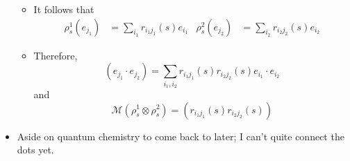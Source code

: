\documentclass[../notes.tex]{subfiles}
\begin{document}
\begin{itemize}
\begin{itemize}
        \item It follows that
        \begin{align*}
            \rho_s^1(e_{j_1}) &= \sum_{i_1}r_{i_1j_1}(s)e_{i_1}&
            \rho_s^2(e_{j_2}) &= \sum_{i_2}r_{i_2j_2}(s)e_{i_2}
        \end{align*}
        \item Therefore,
        \begin{equation*}
            [\rho_s^1\otimes\rho_s^2](e_{j_1}\cdot e_{j_2}) = \sum_{i_1,i_2}r_{i_1j_1}(s)r_{i_2j_2}(s)e_{i_1}\cdot e_{i_2}
        \end{equation*}
        and
        \begin{equation*}
            \mathcal{M}(\rho_s^1\otimes\rho_s^2) = (r_{i_1j_1}(s)r_{i_2j_2}(s))
        \end{equation*}
    \end{itemize}
    \item Aside on quantum chemistry to come back to later; I can't quite connect the dots yet.
\end{itemize}
\end{document}
